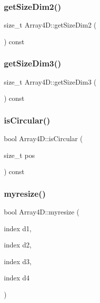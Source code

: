 \mbox{\label{class_array4_d_abc321f73fd2665ac1c58afaf3ebe60e6}} 
\subsubsection{\texorpdfstring{get\+Size\+Dim2()}{getSizeDim2()}}
{\footnotesize\ttfamily size\+\_\+t Array4\+D\+::get\+Size\+Dim2 (\begin{DoxyParamCaption}{ }\end{DoxyParamCaption}) const}

\mbox{\label{class_array4_d_af767db0beba39cd815b903a8076d2695}} 
\subsubsection{\texorpdfstring{get\+Size\+Dim3()}{getSizeDim3()}}
{\footnotesize\ttfamily size\+\_\+t Array4\+D\+::get\+Size\+Dim3 (\begin{DoxyParamCaption}{ }\end{DoxyParamCaption}) const}

\mbox{\label{class_array4_d_abbcf6caa1305cd5709e6f194e961614d}} 
\subsubsection{\texorpdfstring{is\+Circular()}{isCircular()}}
{\footnotesize\ttfamily bool Array4\+D\+::is\+Circular (\begin{DoxyParamCaption}\item[{size\+\_\+t}]{pos }\end{DoxyParamCaption}) const}

\mbox{\label{class_array4_d_ae829ad7badd47b721a9ecea2324f3168}} 
\subsubsection{\texorpdfstring{myresize()}{myresize()}}
{\footnotesize\ttfamily bool Array4\+D\+::myresize (\begin{DoxyParamCaption}\item[{index}]{d1,  }\item[{index}]{d2,  }\item[{index}]{d3,  }\item[{index}]{d4 }\end{DoxyParamCaption})}


